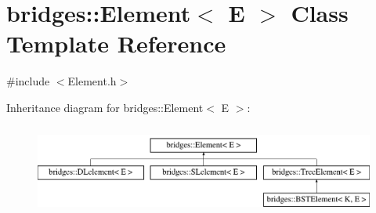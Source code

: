 \hypertarget{classbridges_1_1_element}{}\section{bridges\+:\+:Element$<$ E $>$ Class Template Reference}
\label{classbridges_1_1_element}


{\ttfamily \#include $<$Element.\+h$>$}

Inheritance diagram for bridges\+:\+:Element$<$ E $>$\+:\begin{figure}[H]
\begin{center}
\leavevmode
\includegraphics[height=3.000000cm]{classbridges_1_1_element}
\end{center}
\end{figure}
